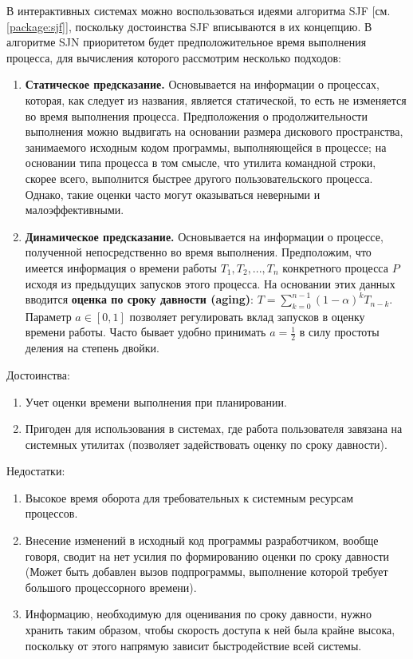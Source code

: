 В интерактивных системах можно воспользоваться идеями алгоритма SJF [см. \ref{package:sjf}], поскольку достоинства SJF вписываются в их концепцию. В алгоритме SJN приоритетом будет предположительное время выполнения процесса, для вычисления которого рассмотрим несколько подходов:

\begin{enumerate}[label=---]
\item \textbf{Статическое предсказание.} Основывается на информации о процессах, которая, как следует из названия, является статической, то есть не изменяется во время выполнения процесса. Предположения о продолжительности выполнения можно выдвигать на основании размера дискового пространства, занимаемого исходным кодом программы, выполняющейся в процессе; на основании типа процесса в том смысле, что утилита командной строки, скорее всего, выполнится быстрее другого пользовательского процесса. Однако, такие оценки  часто могут оказываться неверными и малоэффективными.

\item \textbf{Динамическое предсказание.} Основывается на информации о процессе, полученной непосредственно во время выполнения. Предположим, что имеется информация о времени работы $T_1, T_2, ..., T_n$ конкретного процесса $P$ исходя из предыдущих запусков этого процесса. На основании этих данных вводится \textbf{оценка по сроку давности (aging)}: $T = \sum_{k=0}^{n-1}{(1 - \alpha)^{k}T_{n-k}} $. Параметр $a \in [0,1]$ позволяет регулировать вклад запусков в оценку времени работы. Часто бывает удобно принимать $a = \frac{1}{2}$ в силу простоты деления на степень двойки.
\end{enumerate}

Достоинства:
\begin{enumerate}[label=---]
\item Учет оценки времени выполнения при планировании.
\item Пригоден для использования в системах, где работа пользователя завязана на системных утилитах (позволяет задействовать оценку по сроку давности).
\end{enumerate}

Недостатки:
\begin{enumerate}[label=---]
\item Высокое время оборота для требовательных к системным ресурсам процессов.
\item Внесение изменений в исходный код программы разработчиком, вообще говоря, сводит на нет усилия по формированию оценки по сроку давности (Может быть добавлен вызов подпрограммы, выполнение которой требует большого процессорного времени).

\item Информацию, необходимую для оценивания по сроку давности, нужно хранить таким образом, чтобы скорость доступа к ней была крайне высока, поскольку от этого напрямую зависит быстродействие всей системы. 
\end{enumerate}